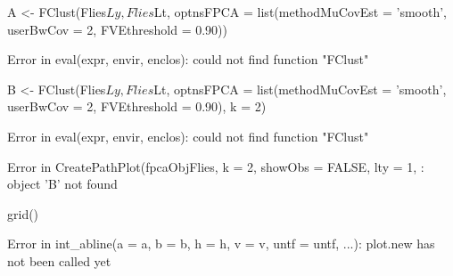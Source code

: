 \documentclass[11pt,english]{article}\usepackage[]{graphicx}\usepackage[]{color}
\begin{document}
\begin{Schunk}
\begin{Sinput}
A <- FClust(Flies$Ly, Flies$Lt, optnsFPCA = list(methodMuCovEst = 'smooth', userBwCov = 2, FVEthreshold = 0.90))
\end{Sinput}
\begin{Soutput}
Error in eval(expr, envir, enclos): could not find function "FClust"
\end{Soutput}
\begin{Sinput}
B <- FClust(Flies$Ly, Flies$Lt, optnsFPCA = list(methodMuCovEst = 'smooth', userBwCov = 2, FVEthreshold = 0.90), k = 2)
\end{Sinput}
\begin{Soutput}
Error in eval(expr, envir, enclos): could not find function "FClust"
\end{Soutput}
\begin{Soutput}
Error in CreatePathPlot(fpcaObjFlies, k = 2, showObs = FALSE, lty = 1, : object 'B' not found
\end{Soutput}
\begin{Sinput}
grid()
\end{Sinput}
\begin{Soutput}
Error in int_abline(a = a, b = b, h = h, v = v, untf = untf, ...): plot.new has not been called yet
\end{Soutput}
\end{Schunk}


%
\end{document}
